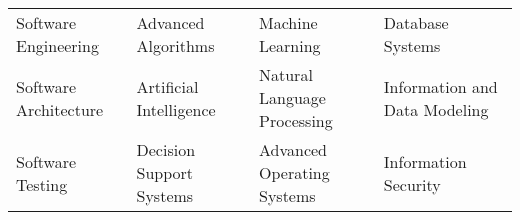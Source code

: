 \vspace{1mm}

\begin{cvparagraph}
\begin{tabular}{ p{4cm} p{4cm} p{5cm} p{4cm}}
Software Engineering&
Advanced Algorithms&
Machine Learning&
Database Systems\\
Software Architecture&
Artificial Intelligence&
Natural Language Processing&
Information and Data Modeling\\
Software Testing&
Decision Support Systems&
Advanced Operating Systems&
Information Security
\\



\end{tabular}
\end{cvparagraph}